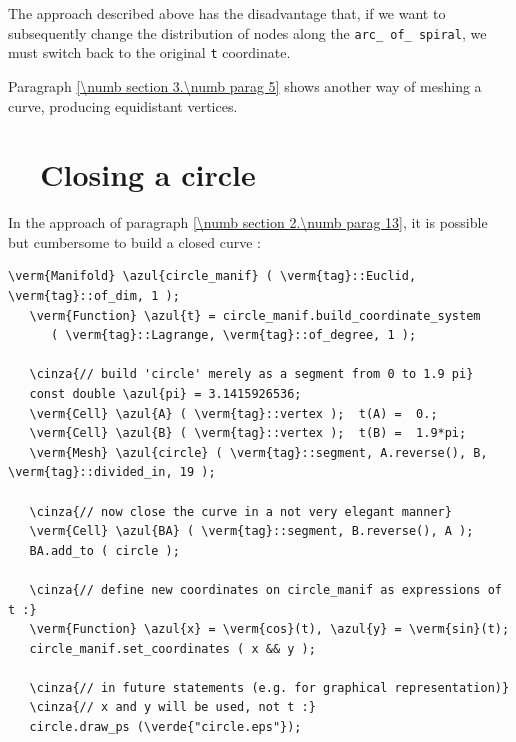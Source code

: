 The approach described above has the disadvantage that, if we want to subsequently change the
distribution of nodes along the {\small\tt arc\_\,of\_\,spiral}, we must switch back to the original
{\small\tt t} coordinate.

Paragraph \ref{\numb section 3.\numb parag 5} shows another way of meshing a curve,
producing equidistant vertices.


\section{~~Closing a circle}\label{\numb section 2.\numb parag 14}

In the approach of paragraph \ref{\numb section 2.\numb parag 13}, it is possible but cumbersome to
build a closed curve :

\begin{Verbatim}[commandchars=\\\{\},formatcom=\small\tt,frame=single,
   label=parag-\ref{\numb section 2.\numb parag 14}.cpp,rulecolor=\color{coment},
   baselinestretch=0.94,framesep=2mm]
   \verm{Manifold} \azul{circle_manif} ( \verm{tag}::Euclid, \verm{tag}::of_dim, 1 );
   \verm{Function} \azul{t} = circle_manif.build_coordinate_system
      ( \verm{tag}::Lagrange, \verm{tag}::of_degree, 1 );

   \cinza{// build 'circle' merely as a segment from 0 to 1.9 pi}
   const double \azul{pi} = 3.1415926536;
   \verm{Cell} \azul{A} ( \verm{tag}::vertex );  t(A) =  0.;
   \verm{Cell} \azul{B} ( \verm{tag}::vertex );  t(B) =  1.9*pi;
   \verm{Mesh} \azul{circle} ( \verm{tag}::segment, A.reverse(), B, \verm{tag}::divided_in, 19 );

   \cinza{// now close the curve in a not very elegant manner}
   \verm{Cell} \azul{BA} ( \verm{tag}::segment, B.reverse(), A );
   BA.add_to ( circle );

   \cinza{// define new coordinates on circle_manif as expressions of t :}
   \verm{Function} \azul{x} = \verm{cos}(t), \azul{y} = \verm{sin}(t);
   circle_manif.set_coordinates ( x && y );

   \cinza{// in future statements (e.g. for graphical representation)}
   \cinza{// x and y will be used, not t :}
   circle.draw_ps (\verde{"circle.eps"});
\end{Verbatim}


